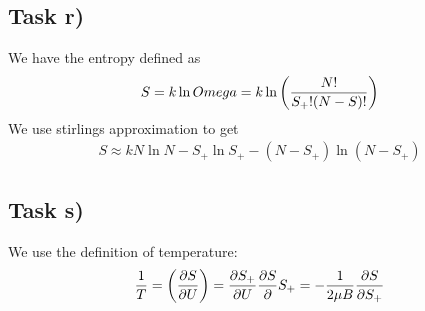 \documentclass[12p,a4paper]{article}
\begin{document}
\subsection{Task r)}
We have the entropy defined as
\begin{align*}
    S = k\ln{Omega} = k\ln\qty(\frac{N!}{S_+!(N-S)!})
\end{align*}
We use stirlings approximation to get
\begin{align*}
    S \approx k N \ln N - S_+ \ln S_+ - (N-S_+)\ln(N-S_+)
\end{align*}

\subsection{Task s)}
We use the definition of temperature:
\begin{align*}
    \frac{1}{T} = \qty(\frac{\partial S}{\partial U}) = \frac{\partial S_+}{\partial U}\frac{\partial S}\partial{S_+} = -\frac{1}{2\mu B}\frac{\partial S}{\partial S_+}
\end{align*}
\end{document}
